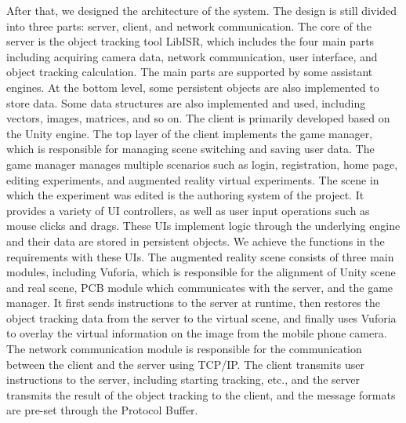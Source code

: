\begin{bigabstract}
After that, we designed the architecture of the system. The design is still divided into three parts: server, client, and network communication. The core of the server is the object tracking tool LibISR, which includes the four main parts including acquiring camera data, network communication, user interface, and object tracking calculation. The main parts are supported by some assistant engines. At the bottom level, some persistent objects are also implemented to store data. Some data structures are also implemented and used, including vectors, images, matrices, and so on. The client is primarily developed based on the Unity engine. The top layer of the client implements the game manager, which is responsible for managing scene switching and saving user data. The game manager manages multiple scenarios such as login, registration, home page, editing experiments, and augmented reality virtual experiments. The scene in which the experiment was edited is the authoring system of the project. It provides a variety of UI controllers, as well as user input operations such as mouse clicks and drags. These UIs implement logic through the underlying engine and their data are stored in persistent objects. We achieve the functions in the requirements with these UIs. The augmented reality scene consists of three main modules, including Vuforia, which is responsible for the alignment of Unity scene and real scene, PCB module which communicates with the server, and the game manager. It first sends instructions to the server at runtime, then restores the object tracking data from the server to the virtual scene, and finally uses Vuforia to overlay the virtual information on the image from the mobile phone camera. The network communication module is responsible for the communication between the client and the server using TCP/IP. The client transmits user instructions to the server, including starting tracking, etc., and the server transmits the result of the object tracking to the client, and the message formats are pre-set through the Protocol Buffer.


\end{bigabstract}
